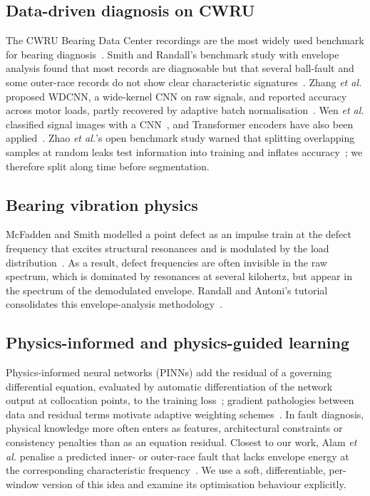 \documentclass[conference]{IEEEtran}
\begin{document}
\subsection{Data-driven diagnosis on CWRU}
The CWRU Bearing Data Center recordings are the most widely used benchmark for
bearing diagnosis~\cite{cwru}. Smith and Randall's benchmark study with
envelope analysis found that most records are diagnosable but that several
ball-fault and some outer-race records do not show clear characteristic
signatures~\cite{smith2015}. Zhang \emph{et al.} proposed WDCNN, a wide-kernel
CNN on raw signals, and reported accuracy across motor loads, partly recovered
by adaptive batch normalisation~\cite{zhang2017}. Wen \emph{et al.} classified
signal images with a CNN~\cite{wen2018}, and Transformer encoders have also been
applied~\cite{costa2022}. Zhao \emph{et al.}'s open benchmark study warned that
splitting overlapping samples at random leaks test information into training
and inflates accuracy~\cite{zhao2020}; we therefore split along time before
segmentation.

\subsection{Bearing vibration physics}
McFadden and Smith modelled a point defect as an impulse train at the defect
frequency that excites structural resonances and is modulated by the load
distribution~\cite{mcfadden1984}. As a result, defect frequencies are often
invisible in the raw spectrum, which is dominated by resonances at several
kilohertz, but appear in the spectrum of the demodulated envelope. Randall and
Antoni's tutorial consolidates this envelope-analysis methodology~\cite{randall2011}.

\subsection{Physics-informed and physics-guided learning}
Physics-informed neural networks (PINNs) add the residual of a governing
differential equation, evaluated by automatic differentiation of the network
output at collocation points, to the training loss~\cite{raissi2019}; gradient
pathologies between data and residual terms motivate adaptive weighting
schemes~\cite{wang2021,mcclenny2023}. In fault diagnosis, physical knowledge
more often enters as features, architectural constraints or consistency
penalties than as an equation residual. Closest to our work, Alam \emph{et al.}
penalise a predicted inner- or outer-race fault that lacks envelope energy at
the corresponding characteristic frequency~\cite{alam2025}. We use a soft,
differentiable, per-window version of this idea and examine its optimisation
behaviour explicitly.
\end{document}

